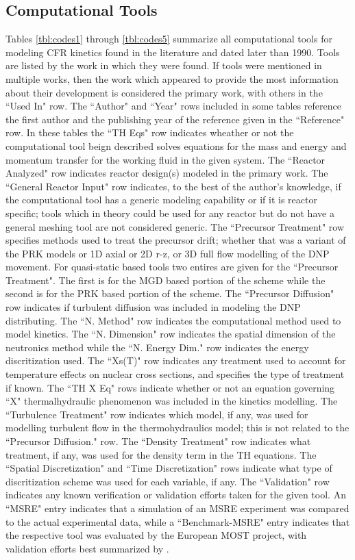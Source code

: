 \documentclass[review]{elsarticle}
\begin{document}
\begin{appendices}

\section{Computational Tools} \label{app:tools}
Tables \ref{tbl:codes1} through \ref{tbl:codes5}
 summarize all computational
tools for modeling CFR kinetics 
found in the literature and dated later than 1990. Tools are listed by the
work in which they were found. If tools were mentioned in multiple works, then
the work which appeared to provide the most information about their development
is considered
the primary work, with others in the ``Used In" row. The ``Author" and ``Year"
rows included in some tables reference the first author and the publishing year
of the reference given in the ``Reference" row. In these tables the ``TH Eqs"
row indicates wheather or not the computational tool beign described solves
equations for the mass and energy and momentum transfer for the working fluid in
the given system. The
``Reactor Analyzed" row indicates reactor design(s) modeled in
the primary work. The ``General Reactor Input" row indicates, to the best
of the author's knowledge, if the computational tool has a generic modeling
capability or if it is reactor specific; tools which in theory could be used for
any reactor but do not have a general meshing tool are not considered generic.
The ``Precursor Treatment" row specifies methods used to
treat the precursor drift; whether that was a variant of the PRK models
or 1D axial or 2D r-z, or 3D full flow modelling of the DNP movement. For
quasi-static based tools two entires are given for the ``Precursor Treatment".
The first is for the MGD based portion of the scheme while the second is for the
PRK based portion of the scheme.
The ``Precursor Diffusion" row indicates if turbulent diffusion was included in
modeling the DNP distributing.
The ``N. Method" row indicates the computational method used to model
kinetics. The ``N. Dimension" row indicates the spatial dimension of 
the neutronics method while the ``N. Energy Dim." row indicates the energy
discritization used.
The ``Xs(T)" row indicates any treatment used to account for temperature
effects on nuclear cross sections, and specifies the type of treatment if known.
The ``TH X Eq" rows indicate whether or not an equation governing ``X" thermalhydraulic
phenomenon was
included in the kinetics modelling.
The ``Turbulence Treatment" row 
indicates which model, if any, was used for modelling turbulent flow in the
thermohydraulics model; this is not related to the ``Precursor Diffusion." row.
The ``Density Treatment" row indicates what treatment, if any, was used for the
density term in the TH equations. The ``Spatial Discretization" and ``Time
Discretization" rows indicate what type of discritization scheme was
used for each variable, if any. The ``Validation" row indicates any known
verification
or validation efforts taken for the given tool. An ``MSRE" entry indicates
that a simulation of an MSRE experiment was compared to the actual experimental
data, while a ``Benchmark-MSRE" entry indicates that the respective tool was
evaluated by the European MOST project, with validation efforts best
summarized by \cite{delpech_benchmark_2003}.


\end{appendices}
\end{document}
